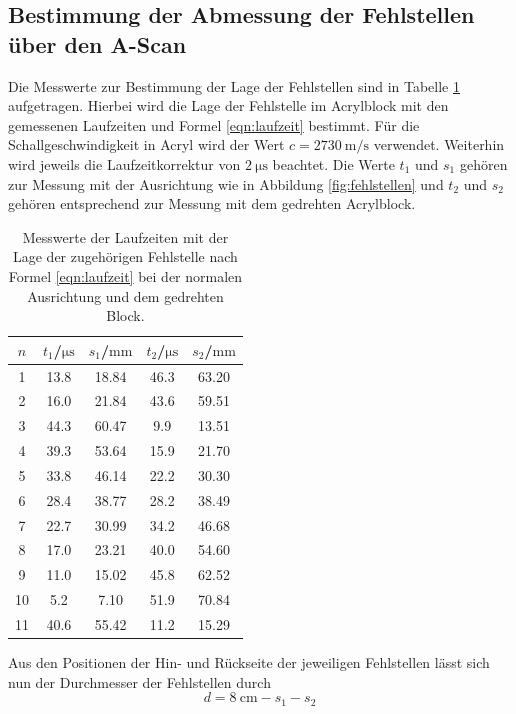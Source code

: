 \FloatBarrier
\subsection{Bestimmung der Abmessung der Fehlstellen über den A-Scan}
Die Messwerte zur Bestimmung der Lage der Fehlstellen sind in Tabelle \ref{tab:ascan}
aufgetragen. Hierbei wird die Lage der Fehlstelle im Acrylblock mit den gemessenen Laufzeiten
und Formel \eqref{eqn:laufzeit} bestimmt. Für die Schallgeschwindigkeit in Acryl wird der
Wert $c = \SI{2730}{\meter\per\second}$ verwendet. Weiterhin wird jeweils die Laufzeitkorrektur
von $\SI{2}{\micro\second}$ beachtet.
Die Werte $t_1$ und $s_1$ gehören zur Messung mit der Ausrichtung wie in Abbildung
\ref{fig:fehlstellen} und $t_2$ und $s_2$ gehören entsprechend zur Messung mit dem gedrehten
Acrylblock.
\begin{table}
  \centering
	\caption{Messwerte der Laufzeiten mit der Lage der zugehörigen Fehlstelle nach Formel \eqref{eqn:laufzeit} bei der normalen Ausrichtung und dem gedrehten Block.}
	\label{tab:ascan}
	\begin{tabular}{ccccc}
		\toprule
		$n$ & $t_1$/$\si{\micro\second}$ & $s_1$/$\si{\milli\meter}$ & $t_2$/$\si{\micro\second}$ & $s_2$/$\si{\milli\meter}$ \\
		\midrule
		1 & 13.8 & 18.84 & 46.3 & 63.20 \\
		2 & 16.0 & 21.84 & 43.6 & 59.51 \\
		3 & 44.3 & 60.47 & 9.9 & 13.51 \\
		4 & 39.3 & 53.64 & 15.9 & 21.70 \\
		5 & 33.8 & 46.14 & 22.2 & 30.30 \\
		6 & 28.4 & 38.77 & 28.2 & 38.49 \\
		7 & 22.7 & 30.99 & 34.2 & 46.68 \\
		8 & 17.0 & 23.21 & 40.0 & 54.60 \\
		9 & 11.0 & 15.02 & 45.8 & 62.52 \\
		10 & 5.2 & 7.10 & 51.9 & 70.84 \\
		11 & 40.6 & 55.42 & 11.2 & 15.29 \\
		\bottomrule
	\end{tabular}
\end{table}
Aus den Positionen der Hin- und Rückseite der jeweiligen Fehlstellen lässt sich nun der
Durchmesser der Fehlstellen durch
\begin{equation*}
	d = \SI{8}{\centi\meter} - s_1 - s_2
\end{equation*}
